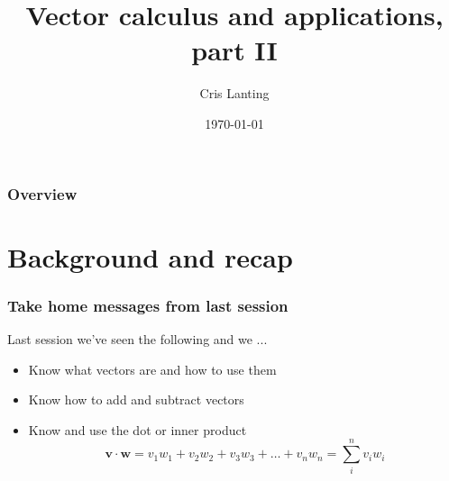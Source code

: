 \documentclass{beamer}
\title[Vectors and other useful stuf]{Vector calculus and applications, part II} %
\author{Cris Lanting} %
\institute[UMCG] %
{
University Medical Center Groningen \\ %
Dept. of Otorhinolaryngology\\
\medskip
\textit{c.p.lanting@umcg.nl\\
https://github.com/Crisly/MathcourseBCN
} %
}
\date{\today} %
\begin{document}
\begin{frame}
\titlepage %
\end{frame}

\begin{frame}
\frametitle{Overview} %
\tableofcontents %
\end{frame}


\section{Background and recap} %

\begin{frame}
\frametitle{Take home messages from last session}
Last session we've seen the following and we ...
\begin{itemize}
\item Know what vectors are and how to use them
\item Know how to add and subtract vectors
\item Know and use the dot or inner product
$$ \mathbf{v} \cdot \mathbf{w} = v_1w_1 + v_2w_2 + v_3w_3 + \ldots + v_nw_n = \sum_i^n v_iw_i$$\
\end{itemize}
\end{frame}
\end{document}
